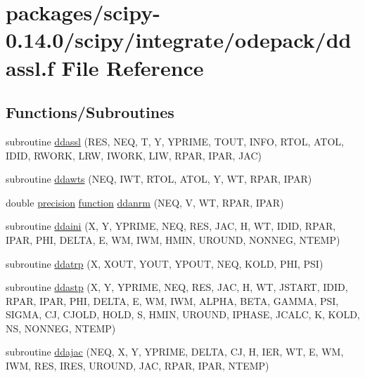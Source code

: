\hypertarget{ddassl_8f}{}\section{packages/scipy-\/0.14.0/scipy/integrate/odepack/ddassl.f File Reference}
\label{ddassl_8f}
\subsection*{Functions/\+Subroutines}
\begin{DoxyCompactItemize}
\item 
subroutine \hyperlink{ddassl_8f_a453752410fe5f099a95e2a0cdebd3423}{ddassl} (R\+E\+S, N\+E\+Q, T, Y, Y\+P\+R\+I\+M\+E, T\+O\+U\+T, I\+N\+F\+O, R\+T\+O\+L, A\+T\+O\+L, I\+D\+I\+D, R\+W\+O\+R\+K, L\+R\+W, I\+W\+O\+R\+K, L\+I\+W, R\+P\+A\+R, I\+P\+A\+R, J\+A\+C)
\item 
subroutine \hyperlink{ddassl_8f_ad9040cc861842aba0f0355141036751a}{ddawts} (N\+E\+Q, I\+W\+T, R\+T\+O\+L, A\+T\+O\+L, Y, W\+T, R\+P\+A\+R, I\+P\+A\+R)
\item 
double \hyperlink{numinquire_8h_a2c8e616467665d0b2814d4c1589ba74e}{precision} \hyperlink{afunc_8m_a7b5e596df91eadea6c537c0825e894a7}{function} \hyperlink{ddassl_8f_ad380a6e6c7632cba7344494b3308b4f0}{ddanrm} (N\+E\+Q, V, W\+T, R\+P\+A\+R, I\+P\+A\+R)
\item 
subroutine \hyperlink{ddassl_8f_a63e4fe787311c5e21d9dd1751203080b}{ddaini} (X, Y, Y\+P\+R\+I\+M\+E, N\+E\+Q, R\+E\+S, J\+A\+C, H, W\+T, I\+D\+I\+D, R\+P\+A\+R, I\+P\+A\+R, P\+H\+I, D\+E\+L\+T\+A, E, W\+M, I\+W\+M, H\+M\+I\+N, U\+R\+O\+U\+N\+D, N\+O\+N\+N\+E\+G, N\+T\+E\+M\+P)
\item 
subroutine \hyperlink{ddassl_8f_a872cbfe7aaf8c2842999bdf43a8b59b1}{ddatrp} (X, X\+O\+U\+T, Y\+O\+U\+T, Y\+P\+O\+U\+T, N\+E\+Q, K\+O\+L\+D, P\+H\+I, P\+S\+I)
\item 
subroutine \hyperlink{ddassl_8f_abb417f0390925e58502da3f99340cf3c}{ddastp} (X, Y, Y\+P\+R\+I\+M\+E, N\+E\+Q, R\+E\+S, J\+A\+C, H, W\+T, J\+S\+T\+A\+R\+T, I\+D\+I\+D, R\+P\+A\+R, I\+P\+A\+R, P\+H\+I, D\+E\+L\+T\+A, E, W\+M, I\+W\+M, A\+L\+P\+H\+A, B\+E\+T\+A, G\+A\+M\+M\+A, P\+S\+I, S\+I\+G\+M\+A, C\+J, C\+J\+O\+L\+D, H\+O\+L\+D, S, H\+M\+I\+N, U\+R\+O\+U\+N\+D, I\+P\+H\+A\+S\+E, J\+C\+A\+L\+C, K, K\+O\+L\+D, N\+S, N\+O\+N\+N\+E\+G, N\+T\+E\+M\+P)
\item 
subroutine \hyperlink{ddassl_8f_a78f9d225cea6a903c2d64763734395d3}{ddajac} (N\+E\+Q, X, Y, Y\+P\+R\+I\+M\+E, D\+E\+L\+T\+A, C\+J, H, I\+E\+R, W\+T, E, W\+M, I\+W\+M, R\+E\+S, I\+R\+E\+S, U\+R\+O\+U\+N\+D, J\+A\+C, R\+P\+A\+R, I\+P\+A\+R, N\+T\+E\+M\+P)

\end{DoxyCompactItemize}
